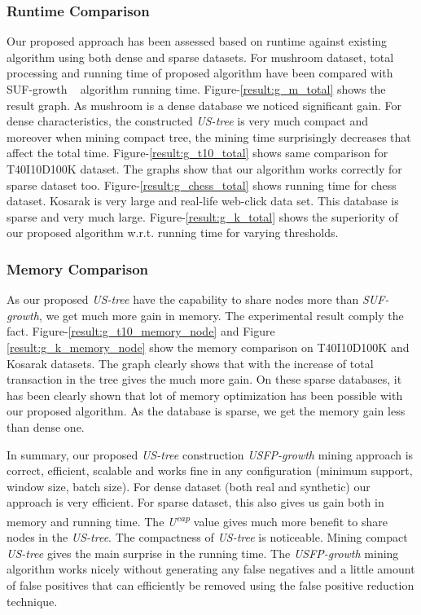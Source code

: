 \documentclass[conference]{IEEEtran}
\begin{document}
\subsubsection{Runtime Comparison}
Our proposed approach has been assessed based on runtime against existing algorithm using both dense and sparse datasets. For mushroom dataset, total processing and running time of proposed algorithm have been compared with SUF-growth ~\cite{DBLP:conf/icde/LeungH09} algorithm running time. Figure-\ref{result:g_m_total} shows the result graph. As mushroom is a dense database we noticed significant gain. For dense characteristics, the constructed \emph{US-tree} is very much compact and moreover when mining compact tree, the mining time surprisingly decreases that affect the total time. Figure-\ref{result:g_t10_total} shows same comparison for T40I10D100K dataset. The graphs show that our algorithm works correctly for sparse dataset too. Figure-\ref{result:g_chess_total} shows running time for chess dataset. Kosarak is very large and real-life web-click data set. This database is sparse and very much large. Figure-\ref{result:g_k_total} shows the superiority of our proposed algorithm w.r.t. running time for varying thresholds.
       
\subsubsection{Memory Comparison}
As our proposed \emph{US-tree} have the capability to share nodes more than \emph{SUF-growth}, we get much more gain in memory. The experimental result comply the fact. Figure-\ref{result:g_t10_memory_node} and Figure \ref{result:g_k_memory_node} show the memory comparison on T40I10D100K and Kosarak datasets. The graph clearly shows that with the increase of total transaction in the tree gives the much more gain. On these sparse databases, it has been clearly shown that lot of memory optimization has been possible with our proposed algorithm. As the database is sparse, we get the memory gain less than dense one.

In summary, our proposed \emph{US-tree} construction \emph{USFP-growth} mining approach is correct, efficient, scalable and works fine in any configuration (minimum support, window size, batch size). For dense dataset (both real and synthetic) our approach is very efficient. For sparse dataset, this also gives us gain both in memory and running time. The \emph{U\textsuperscript{cap}} value gives much more benefit to share nodes in the \emph{US-tree}. The compactness of \emph{US-tree} is noticeable. Mining compact \emph{US-tree} gives the main surprise in the running time. The \emph{USFP-growth} mining algorithm works nicely without generating any false negatives and a little amount of false positives that can efficiently be removed using the false positive reduction technique.
\end{document}
